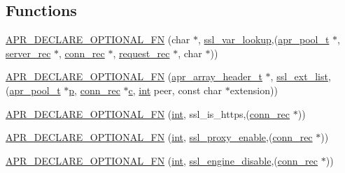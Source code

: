 \subsection*{Functions}
\begin{DoxyCompactItemize}
\item 
\hyperlink{group__MOD__SSL_gadad253b500d00cf4479342906c2aeda5}{A\+P\+R\+\_\+\+D\+E\+C\+L\+A\+R\+E\+\_\+\+O\+P\+T\+I\+O\+N\+A\+L\+\_\+\+FN} (char $\ast$, \hyperlink{group__MOD__SSL__PRIVATE_ga42e6f981345c92e377fc830d91667fa5}{ssl\+\_\+var\+\_\+lookup},(\hyperlink{structapr__pool__t}{apr\+\_\+pool\+\_\+t} $\ast$, \hyperlink{structserver__rec}{server\+\_\+rec} $\ast$, \hyperlink{structconn__rec}{conn\+\_\+rec} $\ast$, \hyperlink{structrequest__rec}{request\+\_\+rec} $\ast$, char $\ast$))
\item 
\hyperlink{group__MOD__SSL_ga5e1b79650dda97c776f4e45614edbbf0}{A\+P\+R\+\_\+\+D\+E\+C\+L\+A\+R\+E\+\_\+\+O\+P\+T\+I\+O\+N\+A\+L\+\_\+\+FN} (\hyperlink{structapr__array__header__t}{apr\+\_\+array\+\_\+header\+\_\+t} $\ast$, \hyperlink{group__MOD__SSL__PRIVATE_ga1e2d59755ec57260e51fbea73ed40909}{ssl\+\_\+ext\+\_\+list},(\hyperlink{structapr__pool__t}{apr\+\_\+pool\+\_\+t} $\ast$\hyperlink{group__APACHE__CORE__MPM_ga5cd91701e5c167f2b1a38e70ab57817e}{p}, \hyperlink{structconn__rec}{conn\+\_\+rec} $\ast$\hyperlink{pcregrep_8txt_aef720ae5f62fa015619d00171d917416}{c}, \hyperlink{pcre_8txt_a42dfa4ff673c82d8efe7144098fbc198}{int} peer, const char $\ast$extension))
\item 
\hyperlink{group__MOD__SSL_ga2fdb487292dbbe59e5a8470bf065d7e3}{A\+P\+R\+\_\+\+D\+E\+C\+L\+A\+R\+E\+\_\+\+O\+P\+T\+I\+O\+N\+A\+L\+\_\+\+FN} (\hyperlink{pcre_8txt_a42dfa4ff673c82d8efe7144098fbc198}{int}, ssl\+\_\+is\+\_\+https,(\hyperlink{structconn__rec}{conn\+\_\+rec} $\ast$))
\item 
\hyperlink{group__MOD__SSL_ga01a25e4dc2ff9db34bc735eca4ab1f42}{A\+P\+R\+\_\+\+D\+E\+C\+L\+A\+R\+E\+\_\+\+O\+P\+T\+I\+O\+N\+A\+L\+\_\+\+FN} (\hyperlink{pcre_8txt_a42dfa4ff673c82d8efe7144098fbc198}{int}, \hyperlink{group__MOD__SSL__PRIVATE_ga91da4675ca466046f81ee17bee79c10d}{ssl\+\_\+proxy\+\_\+enable},(\hyperlink{structconn__rec}{conn\+\_\+rec} $\ast$))
\item 
\hyperlink{group__MOD__SSL_gaff4c22d6b9c993f4d9f54bea16895182}{A\+P\+R\+\_\+\+D\+E\+C\+L\+A\+R\+E\+\_\+\+O\+P\+T\+I\+O\+N\+A\+L\+\_\+\+FN} (\hyperlink{pcre_8txt_a42dfa4ff673c82d8efe7144098fbc198}{int}, \hyperlink{group__MOD__SSL__PRIVATE_ga9e7bf408b385a57ebf50196312adb023}{ssl\+\_\+engine\+\_\+disable},(\hyperlink{structconn__rec}{conn\+\_\+rec} $\ast$))

\end{DoxyCompactItemize}
